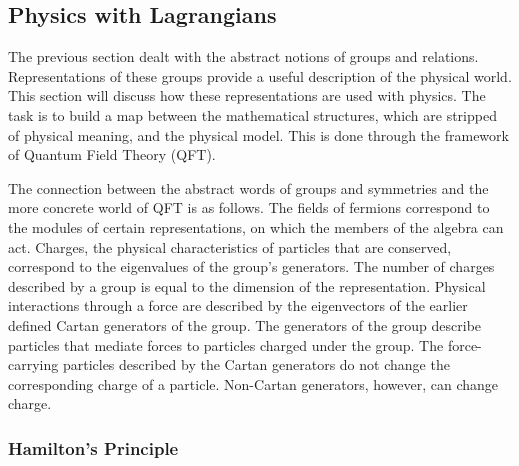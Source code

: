 \subsection{Physics with Lagrangians}\label{sec:smMath}

The previous section dealt with the abstract notions of groups and relations.
Representations of these groups provide a useful description of the physical world.
This section will discuss how these representations are used with physics.
The task is to build a map between the mathematical structures, which are stripped of physical meaning, and the physical model.
This is done through the framework of Quantum Field Theory (QFT).

The connection between the abstract words of groups and symmetries and the more concrete world of QFT is as follows.
The fields of fermions correspond to the modules of certain representations, on which the members of the algebra can act.
Charges, the physical characteristics of particles that are conserved, correspond to the eigenvalues of the group's generators.
The number of charges described by a group is equal to the dimension of the representation.
Physical interactions through a force are described by the eigenvectors of the earlier defined Cartan generators of the group.
The generators of the group describe particles that mediate forces to particles charged under the group.
The force-carrying particles described by the Cartan generators do not change the corresponding charge of a particle.
Non-Cartan generators, however, can change charge.

\subsubsection{Hamilton's Principle}\label{sec:lagrangian}

